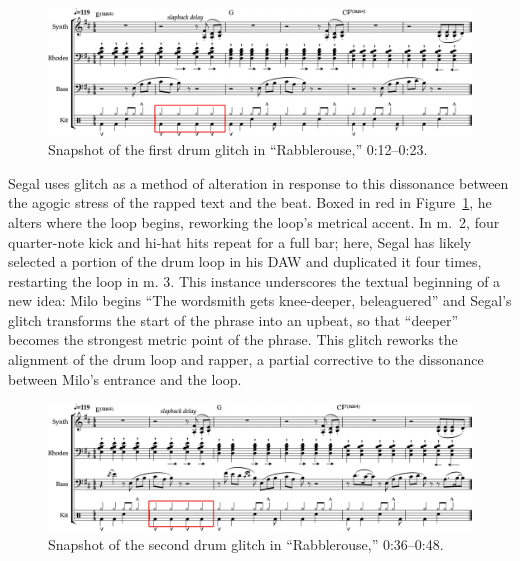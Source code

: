     \begin{figure}[ht]
        \centering
        \includegraphics[width=\textwidth]{images/figures/chp 02/012023rabblefirstglitch.pdf}
        \caption{Snapshot of the first drum glitch in ``Rabblerouse,'' 0:12--0:23.}
        \label{fig:rabblefirstglitch}
    \end{figure}

Segal uses glitch as a method of alteration in response to this dissonance between the agogic
stress of the rapped text and the beat. Boxed in red in Figure~\ref{fig:rabblefirstglitch}, 
he alters where the loop begins, reworking the loop's metrical accent. In m.~2, four quarter-note
kick and hi-hat hits repeat for a full bar; here, Segal has likely selected a portion of the drum
loop in his DAW and duplicated it four times, restarting the loop in m. 3. This instance underscores
the textual beginning of a new idea: Milo begins ``The wordsmith gets knee-deeper, beleaguered'' and
Segal's glitch transforms the start of the phrase into an upbeat, so that ``deeper'' becomes the 
strongest metric point of the phrase. This glitch reworks the alignment of the drum loop and rapper,
a partial corrective to the dissonance between Milo's entrance and the loop.

    \begin{figure}[ht]
        \centering
        \includegraphics[width=\textwidth]{images/figures/chp 02/036048rabblesecondglitch.pdf}
        \caption{Snapshot of the second drum glitch in ``Rabblerouse,'' 0:36--0:48.}
        \label{fig:rabblesecondglitch}
    \end{figure}

